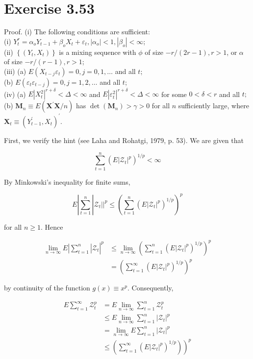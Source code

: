 \documentclass[10pt]{article}
\begin{document}
\section*{Exercise 3.53}
Proof. (i) The following conditions are sufficient:\\
(i) $Y_{t}^{r}=\alpha_{o} Y_{t-1}+\beta_{o} X_{t}+\varepsilon_{t},\left|\alpha_{o}\right|<1,\left|\beta_{o}\right|<\infty$;\\
(ii) $\left\{\left(Y_{t}, X_{t}\right)\right\}$ is a mixing sequence with $\phi$ of size $-r /(2 r-1), r>1$, or $\alpha$ of size $-r /(r-1), r>1$;\\
(iii) (a) $E\left(X_{t-j} \varepsilon_{t}\right)=0, j=0,1, \ldots$ and all $t$;\\
(b) $E\left(\varepsilon_{t} \varepsilon_{t-j}\right)=0, j=1,2, \ldots$ and all $t$;\\
(iv) (a) $E\left|X_{t}^{2}\right|^{r+\delta}<\Delta<\infty$ and $E\left|\varepsilon_{t}^{2}\right|^{r+\delta}<\Delta<\infty$ for some $0<\delta<r$ and all $t ;$\\
(b) $\mathbf{M}_{n} \equiv E\left(\mathbf{X}^{\prime} \mathbf{X} / n\right)$ has $\operatorname{det}\left(\mathbf{M}_{n}\right)>\gamma>0$ for all $n$ sufficiently large, where $\mathbf{X}_{t} \equiv\left(Y_{t-1}^{\prime}, X_{t}\right)^{\prime}$.

First, we verify the hint (see Laha and Rohatgi, 1979, p. 53). We are given that

$$
\sum_{t=1}^{n}\left(E\left|\mathcal{Z}_{t}\right|^{p}\right)^{1 / p}<\infty
$$

By Minkowski's inequality for finite sums,

$$
E\left|\sum_{t=1}^{n}\right| \mathcal{Z}_{t}| |^{p} \leq\left(\sum_{t=1}^{n}\left(E\left|\mathcal{Z}_{t}\right|^{p}\right)^{1 / p}\right)^{p}
$$

for all $n \geq 1$. Hence

$$
\begin{aligned}
\left.\lim _{n \rightarrow \infty} E\left|\sum_{t=1}^{n}\right| \mathcal{Z}_{t}\right|^{p} & \leq \lim _{n \rightarrow \infty}\left(\sum_{t=1}^{n}\left(E\left|\mathcal{Z}_{t}\right|^{p}\right)^{1 / p}\right)^{p} \\
& =\left(\sum_{t=1}^{\infty}\left(E\left|\mathcal{Z}_{t}\right|^{p}\right)^{1 / p}\right)^{p}
\end{aligned}
$$

by continuity of the function $g(x) \equiv x^{p}$. Consequently,

$$
\begin{aligned}
E \sum_{t=1}^{\infty} \mathcal{Z}_{t}^{p} & =E \lim _{n \rightarrow \infty} \sum_{t=1}^{n} \mathcal{Z}_{t}^{p} \\
& \leq E \lim _{n \rightarrow \infty} \sum_{t=1}^{n}\left|\mathcal{Z}_{t}\right|^{p} \\
& =\lim _{n \rightarrow \infty} E \sum_{t=1}^{n}\left|\mathcal{Z}_{t}\right|^{p} \\
& \left.\leq\left(\sum_{t=1}^{\infty}\left(E\left|\mathcal{Z}_{t}\right|^{p}\right)^{1 / p}\right)\right)^{p}
\end{aligned}
$$
\end{document}
